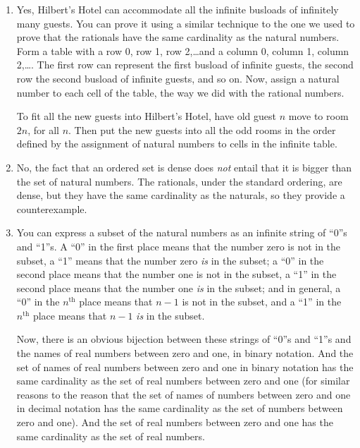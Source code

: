 \documentclass[12pt,a4paper]{article}
\begin{document}
\begin{enumerate}
  
  \item Yes, Hilbert's Hotel can accommodate all the infinite busloads of infinitely many guests. You can prove it using a similar technique to the one we used to prove that the rationals have the same cardinality as the natural numbers. Form a table with a row 0, row 1, row 2,\ldots and a column 0, column 1, column 2,\ldots. The first row can represent the first busload of infinite guests, the second row the second busload of infinite guests, and so on. Now, assign a natural number to each cell of the table, the way we did with the rational numbers.
  
To fit all the new guests into Hilbert's Hotel, have old guest $n$ move to room $2n$, for all $n$. Then put the new guests into all the odd rooms in the order defined by the assignment of natural numbers to cells in the infinite table.
  
\item No, the fact that an ordered set is dense does \emph{not} entail that it is bigger than the set of natural numbers. The rationals, under the standard ordering, are dense, but they have the same cardinality as the naturals, so they provide a counterexample.
 
 \item You can express a subset of the natural numbers as an infinite string of ``0''s and ``1''s. A ``0'' in the first place means that the number zero is not in the subset, a ``1'' means that the number zero \emph{is} in the subset; a ``0'' in the second place means that the number one is not in the subset, a ``1'' in the second place means that the number one \emph{is} in the subset; and in general, a ``0'' in the $n^\text{th}$ place means that $n-1$ is not in the subset, and a ``1'' in the $n^\text{th}$ place means that $n-1$ \emph{is} in the subset.
 
Now, there is an obvious bijection between these strings of ``0''s and ``1''s and the names of real numbers between zero and one, in binary notation. And the set of names of real numbers between zero and one in binary notation has the same cardinality as the set of real numbers between zero and one (for similar reasons to the reason that the set of names of numbers between zero and one in decimal notation has the same cardinality as the set of numbers between zero and one). And the set of real numbers between zero and one has the same cardinality as the set of real numbers.


\end{enumerate}
\end{document}
